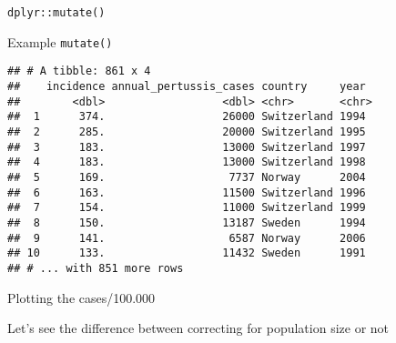 \documentclass[ignorenonframetext,]{beamer}
\newenvironment{Shaded}{\begin{snugshade}}{\end{snugshade}}
\newcommand{\DataTypeTok}[1]{\textcolor[rgb]{0.13,0.29,0.53}{#1}}
\newcommand{\DecValTok}[1]{\textcolor[rgb]{0.00,0.00,0.81}{#1}}
\newcommand{\KeywordTok}[1]{\textcolor[rgb]{0.13,0.29,0.53}{\textbf{#1}}}
\newcommand{\NormalTok}[1]{#1}
\newcommand{\OperatorTok}[1]{\textcolor[rgb]{0.81,0.36,0.00}{\textbf{#1}}}
\newcommand{\StringTok}[1]{\textcolor[rgb]{0.31,0.60,0.02}{#1}}
\begin{document}
\begin{frame}[fragile]{\texttt{dplyr::mutate()}}
\begin{block}{Example \texttt{mutate()}}
\begin{verbatim}
## # A tibble: 861 x 4
##    incidence annual_pertussis_cases country     year 
##        <dbl>                  <dbl> <chr>       <chr>
##  1      374.                  26000 Switzerland 1994 
##  2      285.                  20000 Switzerland 1995 
##  3      183.                  13000 Switzerland 1997 
##  4      183.                  13000 Switzerland 1998 
##  5      169.                   7737 Norway      2004 
##  6      163.                  11500 Switzerland 1996 
##  7      154.                  11000 Switzerland 1999 
##  8      150.                  13187 Sweden      1994 
##  9      141.                   6587 Norway      2006 
## 10      133.                  11432 Sweden      1991 
## # ... with 851 more rows
\end{verbatim}

\end{block}

\begin{block}{Plotting the cases/100.000}

\begin{Shaded}
\end{Shaded}

\end{block}

\begin{block}{Let's see the difference between correcting for population
size or not}


\end{block}
\end{frame}
\end{document}
